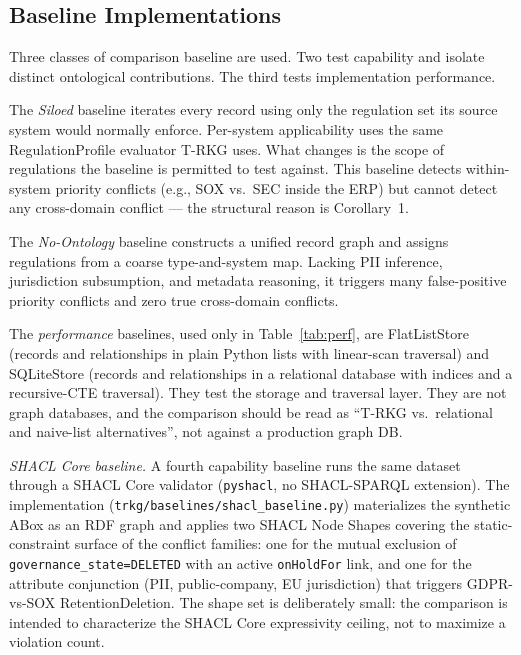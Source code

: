 \documentclass{ieeeaccess}
\begin{document}
\subsection{Baseline Implementations}

Three classes of comparison baseline are used. Two test capability and isolate distinct ontological contributions. The third tests implementation performance.

The \textit{Siloed} baseline iterates every record using only the regulation set its source system would normally enforce. Per-system applicability uses the same RegulationProfile evaluator T-RKG uses. What changes is the scope of regulations the baseline is permitted to test against. This baseline detects within-system priority conflicts (e.g., SOX vs.\ SEC inside the ERP) but cannot detect any cross-domain conflict --- the structural reason is Corollary~1.

The \textit{No-Ontology} baseline constructs a unified record graph and assigns regulations from a coarse type-and-system map. Lacking PII inference, jurisdiction subsumption, and metadata reasoning, it triggers many false-positive priority conflicts and zero true cross-domain conflicts.

The \textit{performance} baselines, used only in Table~\ref{tab:perf}, are FlatListStore (records and relationships in plain Python lists with linear-scan traversal) and SQLiteStore (records and relationships in a relational database with indices and a recursive-CTE traversal). They test the storage and traversal layer. They are not graph databases, and the comparison should be read as ``T-RKG vs.\ relational and naive-list alternatives'', not against a production graph DB.

\textit{SHACL Core baseline.} A fourth capability baseline runs the same dataset through a SHACL Core validator (\texttt{pyshacl}, no SHACL-SPARQL extension). The implementation (\texttt{trkg/baselines/shacl\_baseline.py}) materializes the synthetic ABox as an RDF graph and applies two SHACL Node Shapes covering the static-constraint surface of the conflict families: one for the mutual exclusion of \texttt{governance\_state{=}DELETED} with an active \texttt{onHoldFor} link, and one for the attribute conjunction (PII, public-company, EU jurisdiction) that triggers GDPR-vs-SOX RetentionDeletion. The shape set is deliberately small: the comparison is intended to characterize the SHACL Core expressivity ceiling, not to maximize a violation count.
\end{document}
